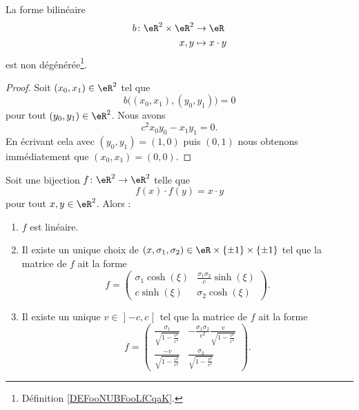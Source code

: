 \begin{lemma}       \label{LEMooUZFKooSIjery}
	La forme bilinéaire
	\begin{equation}
		\begin{aligned}
			b\colon \eR^2\times \eR^2 & \to \eR          \\
			x,y                       & \mapsto x\cdot y
		\end{aligned}
	\end{equation}
	est non dégénérée\footnote{Définition \ref{DEFooNUBFooLfCqaK}.}.
\end{lemma}

\begin{proof}
	Soit \( (x_0,x_1)\in \eR^2\) tel que
	\begin{equation}
		b\big( (x_0,x_1), (y_0,y_1) \big)=0
	\end{equation}
	pour tout \( (y_0,y_1)\in \eR^2\). Nous avons
	\begin{equation}
		c^2x_0y_0-x_1y_1=0.
	\end{equation}
	En écrivant cela avec \( (y_0,y_1)=(1,0)\) puis \( (0,1)\) nous obtenons immédiatement que \( (x_0,x_1)=(0,0)\).
\end{proof}

\begin{theorem}     \label{THOooYHDWooWxVovH}
	Soit une bijection \( f\colon \eR^2\to \eR^2\) telle que
	\begin{equation}
		f(x)\cdot f(y)=x\cdot y
	\end{equation}
	pour tout \( x,y\in \eR^2\). Alors :
	\begin{enumerate}
		\item
		      \( f\) est linéaire.
		\item
		      Il existe un unique choix de \( (x,\sigma_1,\sigma_2)\in \eR\times \{ \pm1 \}\times \{ \pm1 \}\) tel que la matrice de \( f\) ait la forme
		      \begin{equation}
			      f=\begin{pmatrix}
				      \sigma_1\cosh(\xi) & \frac{ \sigma_1\sigma_2 }{ c }\sinh(\xi) \\
				      c\sinh(\xi)        & \sigma_2\cosh(\xi)
			      \end{pmatrix}.
		      \end{equation}
		\item
		      Il existe un unique \( v\in\mathopen] -c , c \mathclose[\) tel que la matrice de \( f\) ait la forme
		      \begin{equation}
			      f=\begin{pmatrix}
				      \frac{ \sigma_1 }{ \sqrt{ 1-\frac{ v^2 }{ c^2 } } } & -\frac{ \sigma_1\sigma_2 }{ c^2 }\frac{ v }{ \sqrt{ 1-\frac{ v^2 }{ c^2 } } } \\
				      \frac{ -v }{ \sqrt{ 1-\frac{ v^2 }{ c^2 } } }       & \frac{ \sigma_2 }{ \sqrt{ 1-\frac{ v^2 }{ c^2 } } }
			      \end{pmatrix}.
		      \end{equation}
	\end{enumerate}
\end{theorem}

